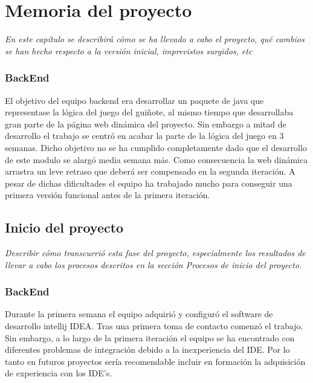 \section{Memoria del proyecto}
\label{memoria}
\emph{En este capítulo se describirá cómo se ha llevado a cabo el proyecto, qué cambios se han hecho respecto a la versión inicial, imprevistos surgidos, etc}
\subsubsection{BackEnd}
El objetivo del equipo backend era desarrollar un paquete de java que representase la lógica del juego del guiñote, al mismo tiempo que desarrollaba gran parte de la página web dinámica del proyecto. Sin embargo a mitad de desarrollo el trabajo se centró en acabar la parte de la lógica del juego en 3 semanas. Dicho objetivo no se ha cumplido completamente dado que el desarrollo de este modulo se alargó media semana más. Como consecuencia la web dinámica arrastra un leve retraso que deberá ser compensado en la segunda iteración. A pesar de dichas dificultades el equipo ha trabajado mucho para conseguir una primera versión funcional antes de la primera iteración.

\subsection{Inicio del proyecto}
\label{Inicio del proyecto}
\emph{Describir cómo transcurrió esta fase del proyecto, especialmente los resultados de llevar a cabo los procesos descritos en la sección Procesos de inicio del proyecto.}
\subsubsection{BackEnd}
Durante la primera semana el equipo adquirió y configuró el software de desarrollo intellij IDEA. Tras una primera toma de contacto comenzó el trabajo. Sin embargo, a lo largo de la primera iteración el equipo se ha encontrado con diferentes problemas de integración debido a la inexperiencia del IDE. Por lo tanto en futuros proyectos sería recomendable incluir en formación la adquisición de experiencia con los IDE's.
